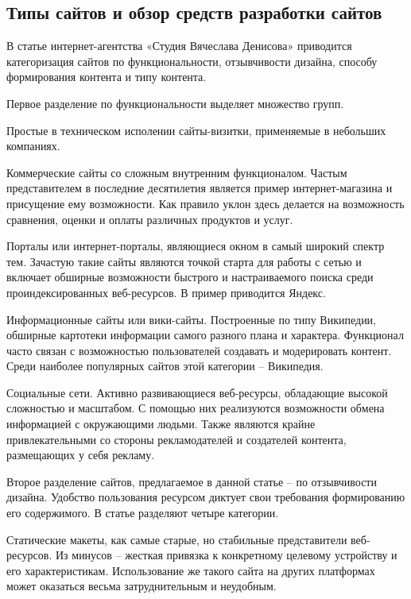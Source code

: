 \subsection{Типы сайтов и обзор средств разработки сайтов}

В статье интернет-агентства «Студия Вячеслава Денисова» \cite{denisov} приводится категоризация сайтов по функциональности, отзывчивости дизайна, способу формирования контента и типу контента.


Первое разделение по функциональности выделяет множество групп.

Простые в техническом исполении сайты-визитки, применяемые в небольших компаниях.

Коммерческие сайты со сложным внутренним функционалом.
Частым представителем в последние десятилетия является пример интернет-магазина и присущение ему возможности.
Как правило уклон здесь делается на возможность сравнения, оценки и оплаты различных продуктов и услуг.

Порталы или интернет-порталы, являющиеся окном в самый широкий спектр тем.
Зачастую такие сайты являются точкой старта для работы с сетью и включает обширные возможности быстрого и настраиваемого поиска среди проиндексированных веб-ресурсов.
В пример приводится Яндекс.

Информационные сайты или вики-сайты.
Построенные по типу Википедии, обширные картотеки информации самого разного плана и характера.
Функционал часто связан с возможностью пользователей создавать и модерировать контент.
Среди наиболее популярных сайтов этой категории -- Википедия.

Социальные сети.
Активно развивающиеся веб-ресурсы, обладающие высокой сложностью и масштабом.
С помощью них реализуются возможности обмена информацией с окружающими людьми.
Также являются крайне привлекательными со стороны рекламодателей и создателей контента, размещающих у себя рекламу.


Второе разделение сайтов, предлагаемое в данной статье -- по отзывчивости дизайна.
Удобство пользования ресурсом диктует свои требования формированию его содержимого.
В статье разделяют четыре категории.

Статические макеты, как самые старые, но стабильные представители веб-ресурсов.
Из минусов -- жесткая привязка к конкретному целевому устройству и его характеристикам.
Использование же такого сайта на других платформах может оказаться весьма затруднительным и неудобным.

